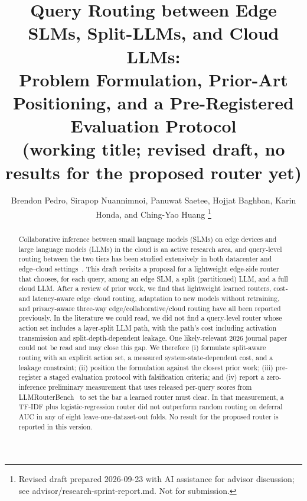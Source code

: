 \documentclass[lettersize,journal]{IEEEtran}
\begin{document}
\title{Query Routing between Edge SLMs, Split-LLMs, and Cloud LLMs:\\
Problem Formulation, Prior-Art Positioning, and a Pre-Registered Evaluation Protocol\\
{\normalsize (working title; revised draft, no results for the proposed router yet)}}

\author{Brendon Pedro, Sirapop Nuannimnoi, Panuwat Saetee, Hojjat Baghban,
Karin Honda, and Ching-Yao Huang%
\thanks{Revised draft prepared 2026-09-23 with AI assistance for advisor
discussion; see advisor/research-sprint-report.md. Not for submission.}}


\maketitle

\begin{abstract}
Collaborative inference between small language models (SLMs) on edge devices and
large language models (LLMs) in the cloud is an active research area, and
query-level routing between the two tiers has been studied extensively in both
datacenter and edge--cloud settings~\cite{li2026collaborative,moslem2026dynamic}.
This draft revisits a proposal for a lightweight edge-side router that chooses,
for each query, among an edge SLM, a split (partitioned) LLM, and a full cloud
LLM. After a review of prior work, we find that lightweight learned routers,
cost- and latency-aware edge--cloud routing, adaptation to new models without
retraining, and privacy-aware three-way edge/collaborative/cloud routing have
all been reported previously. In the literature we could read, we did not find
a query-level router whose action set includes a layer-split LLM path, with the
path's cost including activation transmission and split-depth-dependent
leakage. One likely-relevant 2026 journal paper could not be read and may close
this gap. We therefore (i) formulate split-aware routing with an explicit action
set, a measured system-state-dependent cost, and a leakage constraint; (ii)
position the formulation against the closest prior work; (iii) pre-register a
staged evaluation protocol with falsification criteria; and (iv) report a
zero-inference preliminary measurement that uses released per-query scores from
LLMRouterBench~\cite{li2026llmrouterbench} to set the bar a learned router must
clear. In that measurement, a TF-IDF plus logistic-regression router did not
outperform random routing on deferral AUC in any of eight leave-one-dataset-out
folds. No result for the proposed router is reported in this version.
\end{abstract}
\end{document}
